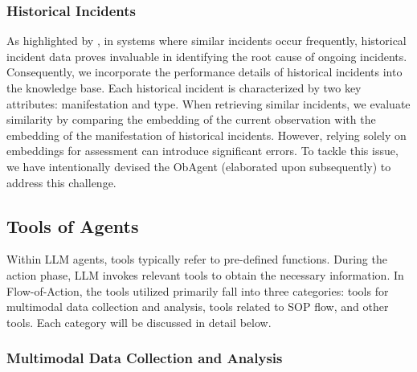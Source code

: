 \subsubsection{Historical Incidents}


As highlighted by \citet{chen2024automatic}, in systems where similar incidents occur frequently, historical incident data proves invaluable in identifying the root cause of ongoing incidents. Consequently, we incorporate the performance details of historical incidents into the knowledge base. Each historical incident is characterized by two key attributes: manifestation and type. When retrieving similar incidents, we evaluate similarity by comparing the embedding of the current observation with the embedding of the manifestation of historical incidents. However, relying solely on embeddings for assessment can introduce significant errors. To tackle this issue, we have intentionally devised the ObAgent (elaborated upon subsequently) to address this challenge.





\subsection{Tools of Agents}

Within LLM agents, tools typically refer to pre-defined functions. During the action phase, LLM invokes relevant tools to obtain the necessary information. In Flow-of-Action, the tools utilized primarily fall into three categories: tools for multimodal data collection and analysis, tools related to SOP flow, and other tools. Each category will be discussed in detail below.




\subsubsection{Multimodal Data Collection and Analysis}

